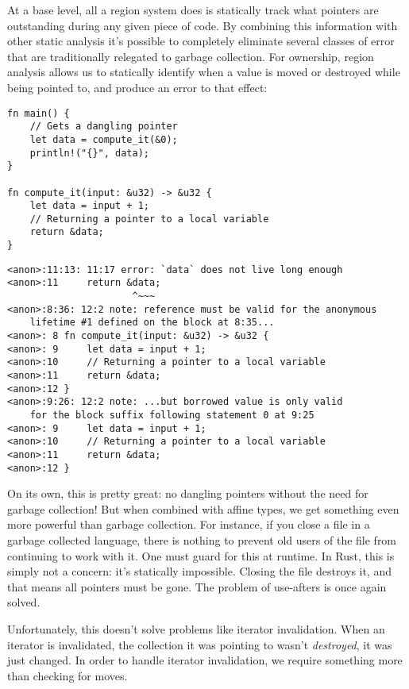 At a base level, all a region system does is statically track what pointers are
outstanding during any given piece of code. By combining this information with
other static analysis it's possible to completely eliminate several classes of error
that are traditionally relegated to garbage collection. For ownership, region analysis allows us
to statically identify when a value is moved or destroyed while being pointed to,
and produce an error to that effect:

\begin{verbatim}
fn main() {
    // Gets a dangling pointer
    let data = compute_it(&0);
    println!("{}", data);
}

fn compute_it(input: &u32) -> &u32 {
    let data = input + 1;
    // Returning a pointer to a local variable
    return &data;
}
\end{verbatim}

\begin{verbatim}
<anon>:11:13: 11:17 error: `data` does not live long enough
<anon>:11     return &data;
                      ^~~~
<anon>:8:36: 12:2 note: reference must be valid for the anonymous
    lifetime #1 defined on the block at 8:35...
<anon>: 8 fn compute_it(input: &u32) -> &u32 {
<anon>: 9     let data = input + 1;
<anon>:10     // Returning a pointer to a local variable
<anon>:11     return &data;
<anon>:12 }
<anon>:9:26: 12:2 note: ...but borrowed value is only valid
    for the block suffix following statement 0 at 9:25
<anon>: 9     let data = input + 1;
<anon>:10     // Returning a pointer to a local variable
<anon>:11     return &data;
<anon>:12 }
\end{verbatim}

On its own, this is pretty great: no dangling pointers without the need for
garbage collection! But when combined with affine types,
we get something even more powerful than garbage collection. For instance, if
you close a file in a garbage collected language, there is nothing to prevent
old users of the file from continuing to work with it. One must guard for
this at runtime. In Rust, this is simply not a concern:
it's statically impossible. Closing the file destroys it, and that means all
pointers must be gone. The problem of use-afters is once again solved.

Unfortunately, this doesn't solve problems like iterator invalidation. When an
iterator is invalidated, the collection it was pointing to wasn't \emph{destroyed},
it was just changed. In order to handle iterator invalidation, we require something
more than checking for moves.

